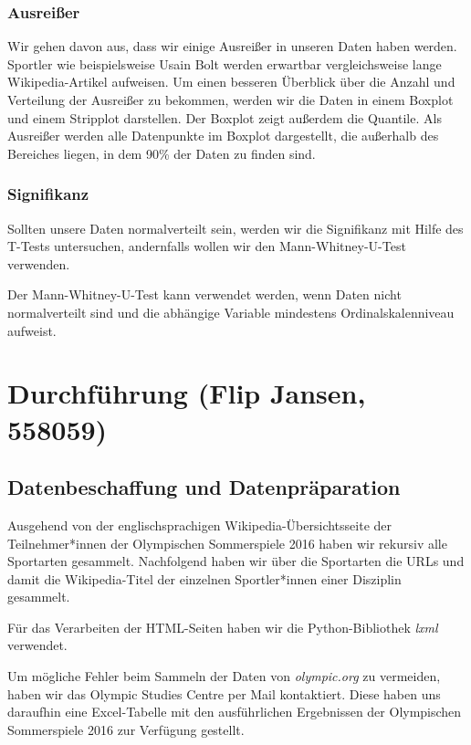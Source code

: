 \documentclass[11pt]{article}
\begin{document}
\subsubsection{Ausreißer}
Wir gehen davon aus, dass wir einige Ausreißer in unseren Daten haben werden. Sportler wie beispielsweise Usain Bolt werden erwartbar vergleichsweise lange Wikipedia-Artikel aufweisen. Um einen besseren Überblick über die Anzahl und Verteilung der Ausreißer zu bekommen, werden wir die Daten in einem Boxplot und einem Stripplot darstellen. Der Boxplot zeigt außerdem die Quantile. Als Ausreißer werden alle Datenpunkte im Boxplot dargestellt, die außerhalb des Bereiches liegen, in dem 90\% der Daten zu finden sind.

\subsubsection{Signifikanz}
Sollten unsere Daten normalverteilt sein, werden wir die Signifikanz mit Hilfe des T-Tests untersuchen, andernfalls wollen wir den Mann-Whitney-U-Test verwenden. 

Der Mann-Whitney-U-Test kann verwendet werden, wenn Daten nicht normalverteilt sind und die abhängige Variable mindestens Ordinalskalenniveau aufweist.


\section{Durchführung (Flip Jansen, 558059)}

\subsection{Datenbeschaffung und Datenpräparation}
Ausgehend von der englischsprachigen Wikipedia-Übersichtsseite der Teilnehmer*innen der Olympischen Sommerspiele 2016 \parencite{wikiOlympicComp} haben wir rekursiv alle Sportarten gesammelt. Nachfolgend haben wir über die Sportarten die URLs und damit die Wikipedia-Titel der einzelnen Sportler*innen einer Disziplin gesammelt. 

Für das Verarbeiten der HTML-Seiten haben wir die Python-Bibliothek \textit{lxml} \parencite{lxml} verwendet.

Um mögliche Fehler beim Sammeln der Daten von \textit{olympic.org} zu vermeiden, haben wir das Olympic Studies Centre per Mail kontaktiert. Diese haben uns daraufhin eine Excel-Tabelle mit den ausführlichen Ergebnissen der Olympischen Sommerspiele 2016 zur Verfügung gestellt.
\end{document}
